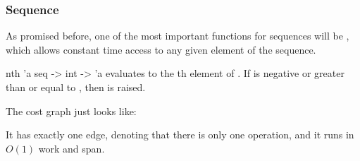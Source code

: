 \documentclass[aspectratio=169, handout]{beamer}
\begin{document}
\begin{frame}[fragile]
  \frametitle{Sequence }

  As promised before, one of the most important functions for sequences
  will be , which allows constant time access to any given element
  of the sequence.

  \pause
  \vspace{\fill}

    \spec
      {nth}
      {'a seq -> int -> 'a}
      {}
      { evaluates to the th element of .
      If  is negative or greater than or equal to ,
      then  is raised.}

  \pause
  \vspace{\fill}

  \begin{center}
  \begin{minipage}{0.7\textwidth}
    The cost graph just looks like:

    \vspace{20pt}

    It has exactly one edge, denoting that there is only one operation, and
    it runs in $O(1)$ work and span.
  \end{minipage}
  \hfill
  \begin{minipage}{0.25\textwidth}
    \centering
  \end{minipage}
  \end{center}
\end{frame}
\end{document}
